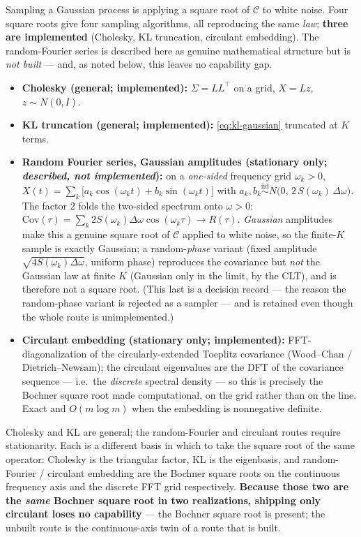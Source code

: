 \documentclass[11pt]{article}
\begin{document}
Sampling a Gaussian process is applying a square root of $\mathcal{C}$ to white noise. Four square
roots give four sampling algorithms, all reproducing the same \emph{law}; \textbf{three are
implemented} (Cholesky, KL truncation, circulant embedding). The random-Fourier series is described
here as genuine mathematical structure but is \emph{not built} --- and, as noted below, this leaves
no capability gap.
\begin{itemize}[leftmargin=1.4cm]
  \item \textbf{Cholesky (general; implemented):} $\Sigma = LL^\top$ on a grid, $X = Lz$, $z\sim
  N(0,I)$.
  \item \textbf{KL truncation (general; implemented):} \eqref{eq:kl-gaussian} truncated at $K$ terms.
  \item \textbf{Random Fourier series, Gaussian amplitudes (stationary only; \emph{described, not
  implemented}):} on a \emph{one-sided} frequency grid $\omega_k>0$,
  $X(t) = \sum_k \big[a_k\cos(\omega_k t) + b_k\sin(\omega_k t)\big]$ with $a_k,b_k
  \overset{\text{iid}}{\sim} N\!\big(0,\,2\,S(\omega_k)\,\Delta\omega\big)$. The factor $2$ folds the
  two-sided spectrum onto $\omega>0$: $\mathrm{Cov}(\tau)=\sum_k 2S(\omega_k)\Delta\omega\cos(\omega_k
  \tau)\to R(\tau)$. \emph{Gaussian} amplitudes make this a genuine square root of $\mathcal{C}$
  applied to white noise, so the finite-$K$ sample is exactly Gaussian; a random-\emph{phase} variant
  (fixed amplitude $\sqrt{4S(\omega_k)\Delta\omega}$, uniform phase) reproduces the covariance but
  \emph{not} the Gaussian law at finite $K$ (Gaussian only in the limit, by the CLT), and is
  therefore not a square root. (This last is a decision record --- the reason the random-phase
  variant is rejected as a sampler --- and is retained even though the whole route is unimplemented.)
  \item \textbf{Circulant embedding (stationary only; implemented):} FFT-diagonalization of the
  circularly-extended Toeplitz covariance (Wood--Chan / Dietrich--Newsam); the circulant eigenvalues
  are the DFT of the covariance sequence --- i.e.\ the \emph{discrete} spectral density --- so this
  is precisely the Bochner square root made computational, on the grid rather than on the line. Exact
  and $O(m\log m)$ when the embedding is nonnegative definite.
\end{itemize}
Cholesky and KL are general; the random-Fourier and circulant routes require stationarity. Each is a
different basis in which to take the square root of the same operator: Cholesky is the triangular
factor, KL is the eigenbasis, and random-Fourier / circulant embedding are the Bochner square roots
on the continuous frequency axis and the discrete FFT grid respectively. \textbf{Because those two
are the \emph{same} Bochner square root in two realizations, shipping only circulant loses no
capability} --- the Bochner square root is present; the unbuilt route is the continuous-axis twin of
a route that is built.
\end{document}
